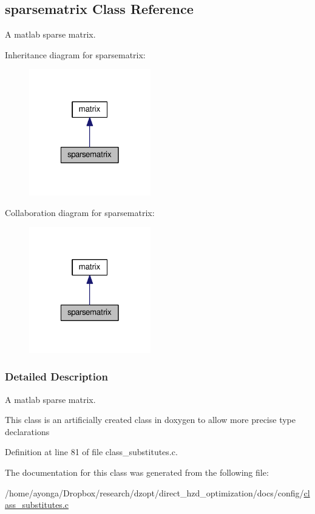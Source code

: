 \hypertarget{classsparsematrix}{}\subsection{sparsematrix Class Reference}
\label{classsparsematrix}


A matlab sparse matrix.  




Inheritance diagram for sparsematrix\+:
\nopagebreak
\begin{figure}[H]
\begin{center}
\leavevmode
\includegraphics[width=150pt]{classsparsematrix__inherit__graph}
\end{center}
\end{figure}


Collaboration diagram for sparsematrix\+:
\nopagebreak
\begin{figure}[H]
\begin{center}
\leavevmode
\includegraphics[width=150pt]{classsparsematrix__coll__graph}
\end{center}
\end{figure}


\subsubsection{Detailed Description}
A matlab sparse matrix. 

This class is an artificially created class in doxygen to allow more precise type declarations 

Definition at line 81 of file class\+\_\+substitutes.\+c.



The documentation for this class was generated from the following file\+:\begin{DoxyCompactItemize}
\item 
/home/ayonga/\+Dropbox/research/dzopt/direct\+\_\+hzd\+\_\+optimization/docs/config/\hyperlink{class__substitutes_8c}{class\+\_\+substitutes.\+c}\end{DoxyCompactItemize}
